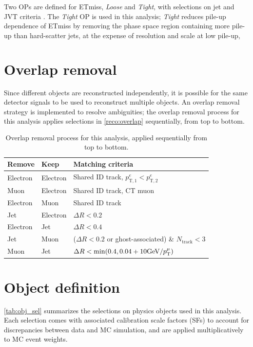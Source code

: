 \documentclass[../thesis.tex]{subfiles}
\begin{document}
Two \acs{OP}s are defined for \acs{ETmiss}, \textit{Loose} and \textit{Tight}, with selections on jet \pT and JVT criteria \citep{reco:met2}. The \textit{Tight} \acs{OP} is used in this analysis; \textit{Tight} reduces pile-up dependence of \acs{ETmiss} by removing the phase space region containing more pile-up than hard-scatter jets, at the expense of resolution and scale at low pile-up,

\section{Overlap removal}
Since different objects are reconstructed independently, it is possible for the same detector signals to be used to reconstruct multiple objects. An overlap removal strategy is implemented to resolve ambiguities; the overlap removal process for this analysis applies selections in \autoref{reco:overlap} sequentially, from top to bottom.

\begin{table}[!ht]
\centering
\caption{\label{reco:overlap}Overlap removal process for this analysis, applied sequentially from top to bottom.}%
\begin{tabular}{lll}
\toprule
Remove		& Keep		& Matching criteria \\
\midrule
Electron	& Electron 	& Shared ID track, $p^e_\mathrm{T,1}<p^e_\mathrm{T,2}$ \\
Muon		& Electron	& Shared ID track, CT muon \\
Electron	& Muon		& Shared ID track \\
Jet			& Electron	& $\Delta R <0.2$ \\
Electron	& Jet		& $\Delta R <0.4$ \\
Jet			& Muon		& ($\Delta R <0.2$ or ghost-associated) \& $N_\text{track}<3$ \\
Muon		& Jet		& $\Delta R < \min(0.4, 0.04+10 \text{GeV/\ensuremath{p_\mathrm{T}^\mu}})$ \\
\bottomrule
\end{tabular}
\end{table}

\section{Object definition}
\label{sec:objdef}
\autoref{tab:obj_sel} summarizes the selections on physics objects used in this analysis. Each selection comes with associated calibration scale factors (\acs{SF}s) to account for discrepancies between data and \acs{MC} simulation, and are applied multiplicatively to \acs{MC} event weights.
\end{document}
